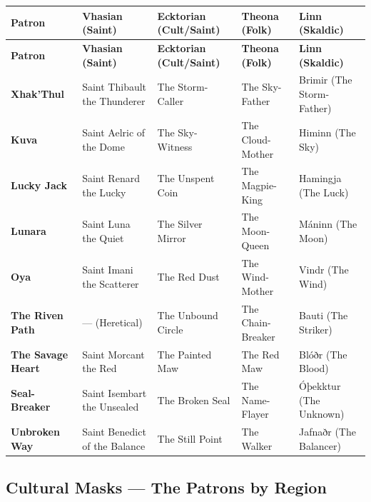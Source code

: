 \begin{longtable}{p{3cm}|p{2.8cm}|p{2.8cm}|p{2.8cm}|p{2.8cm}}
\toprule
\textbf{Patron} & \textbf{Vhasian (Saint)} & \textbf{Ecktorian (Cult/Saint)} & \textbf{Theona (Folk)} & \textbf{Linn (Skaldic)} \\
\midrule
\endfirsthead
\toprule
\textbf{Patron} & \textbf{Vhasian (Saint)} & \textbf{Ecktorian (Cult/Saint)} & \textbf{Theona (Folk)} & \textbf{Linn (Skaldic)} \\
\midrule
\endhead
\bottomrule
\endfoot
\textbf{Xhak'Thul} & Saint Thibault the Thunderer & The Storm-Caller & The Sky-Father & Brimir (The Storm-Father) \\
\textbf{Kuva} & Saint Aelric of the Dome & The Sky-Witness & The Cloud-Mother & Himinn (The Sky) \\
\textbf{Lucky Jack} & Saint Renard the Lucky & The Unspent Coin & The Magpie-King & Hamingja (The Luck) \\
\textbf{Lunara} & Saint Luna the Quiet & The Silver Mirror & The Moon-Queen & Máninn (The Moon) \\
\textbf{Oya} & Saint Imani the Scatterer & The Red Dust & The Wind-Mother & Vindr (The Wind) \\
\textbf{The Riven Path} & --- (Heretical) & The Unbound Circle & The Chain-Breaker & Bauti (The Striker) \\
\textbf{The Savage Heart} & Saint Morcant the Red & The Painted Maw & The Red Maw & Blóðr (The Blood) \\
\textbf{Seal-Breaker} & Saint Isembart the Unsealed & The Broken Seal & The Name-Flayer & Óþekktur (The Unknown) \\
\textbf{Unbroken Way} & Saint Benedict of the Balance & The Still Point & The Walker & Jafnaðr (The Balancer) \\
\bottomrule
\end{longtable}

\subsection{Cultural Masks --- The Patrons by Region}

